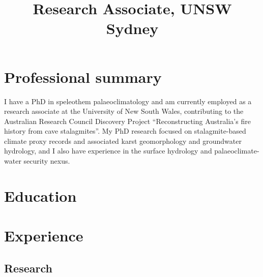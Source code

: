 \documentclass[11pt,a4paper,]{moderncv}
\title{Research Associate, UNSW Sydney}
\begin{document}
\makecvtitle



\hypertarget{professional-summary}{%
\section{Professional summary}\label{professional-summary}}

I have a PhD in speleothem palaeoclimatology and am currently employed
as a research associate at the University of New South Wales,
contributing to the Australian Research Council Discovery Project
``Reconstructing Australia's fire history from cave stalagmites''. My
PhD research focused on stalagmite-based climate proxy records and
associated karst geomorphology and groundwater hydrology, and I also
have experience in the surface hydrology and palaeoclimate-water
security nexus.

\hypertarget{education}{%
\section{Education}\label{education}}

\nopagebreak
    \nopagebreak

\hypertarget{experience}{%
\section{Experience}\label{experience}}

\hypertarget{research}{%
\subsection{Research}\label{research}}
\end{document}
